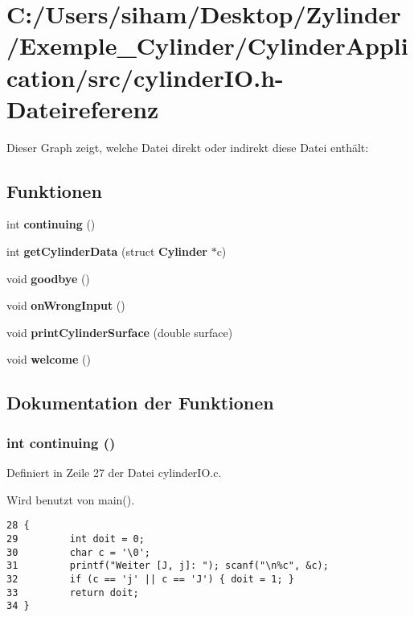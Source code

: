 \section{C:/Users/siham/Desktop/Zylinder/Exemple\_\-Cylinder/Cylinder\-Application/src/cylinder\-IO.h-Dateireferenz}
\label{cylinder_i_o_8h}


Dieser Graph zeigt, welche Datei direkt oder indirekt diese Datei enth\"{a}lt:\subsection*{Funktionen}
\begin{CompactItemize}
\item 
int {\bf continuing} ()
\item 
int {\bf get\-Cylinder\-Data} (struct {\bf Cylinder} $\ast$c)
\item 
void {\bf goodbye} ()
\item 
void {\bf on\-Wrong\-Input} ()
\item 
void {\bf print\-Cylinder\-Surface} (double surface)
\item 
void {\bf welcome} ()
\end{CompactItemize}


\subsection{Dokumentation der Funktionen}
\subsubsection{\setlength{\rightskip}{0pt plus 5cm}int continuing ()}\label{cylinder_i_o_8h_fbf29286f9288c2f6a6a903105442720}




Definiert in Zeile 27 der Datei cylinder\-IO.c.

Wird benutzt von main().

\footnotesize\begin{verbatim}28 {
29         int doit = 0;
30         char c = '\0'; 
31         printf("Weiter [J, j]: "); scanf("\n%c", &c);
32         if (c == 'j' || c == 'J') { doit = 1; }
33         return doit;
34 }
\end{verbatim}\normalsize 



